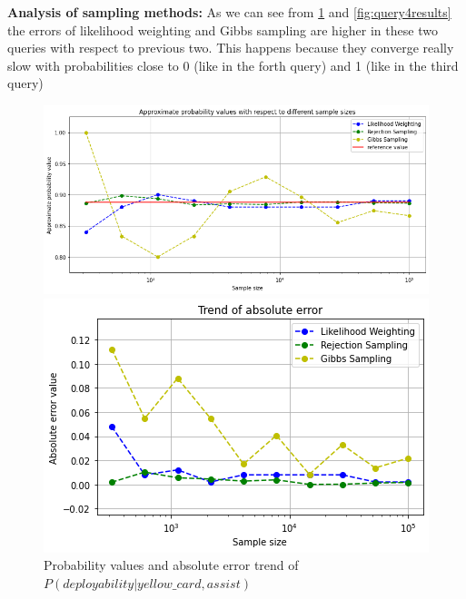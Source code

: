 \documentclass[a4paper,10pt]{report}
\begin{document}
\textbf{Analysis of sampling methods:}
    \newline
    As we can see from \ref{fig:query3results} and \ref{fig:query4results} the errors of likelihood weighting and Gibbs sampling are higher in these two queries with respect to previous two. This happens because they converge really slow with probabilities close to 0 (like in the forth query) and 1 (like in the third query)

\begin{figure}[h]
  \centering\begin{minipage}[b]{0.45\textwidth}
    \includegraphics[width=\textwidth]{assets/img/query3prob.png}
  \end{minipage}
  \hfill\begin{minipage}[b]{0.45\textwidth}
    \includegraphics[width=\textwidth]{assets/img/query3error.png}
  \end{minipage}
\caption{Probability values and absolute error trend of $P(deployability | yellow\_card, assist)$}
\label{fig:query3results}
\end{figure}
\end{document}
